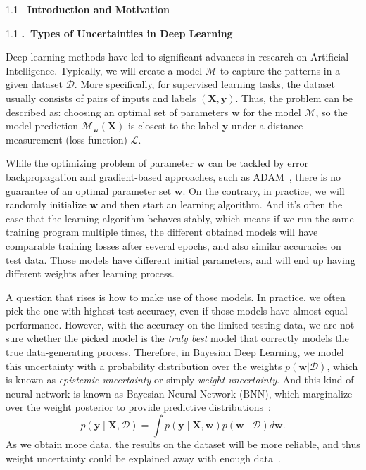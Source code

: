 \documentclass[a4paper,11pt]{article} %
\newcommand{\lineSpace}{1.1}
\newcounter{rSection}
\newcounter{rSubsection}[rSection]
\newenvironment{rSection}[1]{ %
\refstepcounter{rSection}
\begin{spacing}{\lineSpace}
  {\bf \large \therSection~#1 \hfill}  %
	\vspace{0.25em}

}{
\vspace{1em}
\end{spacing}
}
\newenvironment{rSubsection}[1]{ %
  \refstepcounter{rSubsection}
  \begin{spacing}{\lineSpace}
	{\bf\therSection.\therSubsection~#1}

  }{
\end{spacing}
\vspace{0.5em}
}
\begin{document}
\begin{rSection}{Introduction and Motivation}
\begin{rSubsection}{Types of Uncertainties in Deep Learning}
Deep learning methods have led to significant advances in research on Artificial Intelligence. 
Typically, we will create a model $\mathcal{M}$ to capture the patterns in a given dataset $\mathcal{D}$.
More specifically, for supervised learning tasks, the dataset usually consists of pairs of inputs and labels $(\mathbf{X}, \mathbf{y})$.
Thus, the problem can be described as: choosing an optimal set of parameters $\mathbf{w}$ for the model $\mathcal{M}$, so the model prediction $\mathcal{M}_{\mathbf{w}}(\mathbf{X})$ is closest to the label $\mathbf{y}$ under a distance measurement (loss function) $\mathcal{L}$.

While the optimizing problem of parameter $\mathbf{w}$ can be tackled by error backpropagation and gradient-based approaches, such as ADAM~\cite{kingma2014adam}, there is no guarantee of an optimal parameter set $\mathbf{w}$.
On the contrary, in practice, we will randomly initialize $\mathbf{w}$ and then start an learning algorithm.
And it's often the case that the learning algorithm behaves stably, which means if we run the same training program multiple times, the different obtained models will have comparable training losses after several epochs, and also similar accuracies on test data. 
Those models have different initial parameters, and will end up having different weights after learning process.

A question that rises is how to make use of those models.
In practice, we often pick the one with highest test accuracy, even if those models have almost equal performance.
However, with the accuracy on the limited testing data, we are not sure whether the picked model is the \textit{truly best} model that correctly models the true data-generating process. 
Therefore, in Bayesian Deep Learning, we model this uncertainty with a probability distribution over the weights $p(\mathbf{w} | \mathcal{D})$, which is known as \textit{epistemic uncertainty} or simply \textit{weight uncertainty}. 
And this kind of neural network is known as Bayesian Neural Network (BNN), which marginalize over the weight posterior to provide predictive distributions~\cite{wilson2020bayesian}:
\begin{equation}
	p(\mathbf{y} \mid \mathbf{X}, \mathcal{D})
	=
	\int p(\mathbf{y} \mid \mathbf{X}, \mathbf{w}) p(\mathbf{w} \mid \mathcal{D}) d \mathbf{w}.
\end{equation}
As we obtain more data, the results on the dataset will be more reliable, and thus weight uncertainty could be explained away with enough data~\cite{kendall2017uncertainties}.


\end{rSubsection}
\end{rSection}
\end{document}
